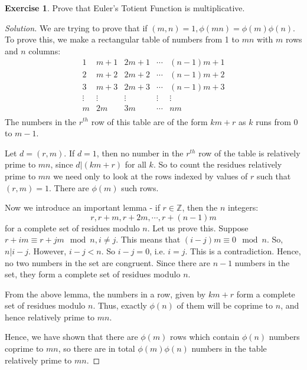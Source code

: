 \documentclass[12pt,letterpaper]{amsbook}
\theoremstyle{definition}
\newtheorem*{exercise}{Exercise}
\newenvironment{solution}
  {\renewcommand\qedsymbol{$\blacksquare$}\begin{proof}[Solution]}
  {\end{proof}}
\newcommand{\Z}{\mathbb{Z}}
\begin{document}
\begin{exercise}
  Prove that Euler's Totient Function is multiplicative. 
\end{exercise}
\begin{solution}
  We are trying to prove that if $(m,n) = 1, \phi(mn) = \phi(m) \phi(n)$. To prove this, we make a rectangular table of numbers from 1 to $mn$ with $m$ rows and $n$ columns:
  \[
  \begin{matrix}
    1 & m+1 & 2m+1 & \cdots & (n-1)m+1 \\ 
    2 & m+2 & 2m+2 & \cdots & (n-1)m+2 \\ 
    3 & m+3 & 2m+3 & \cdots & (n-1)m+3 \\ 
    \vdots & \vdots & \vdots & \vdots & \vdots \\ 
    m & 2m & 3m& \cdots & nm \\ 
  \end{matrix}
\]
  The numbers in the $r^{th}$ row of this table are of the form $km+r$ as $k$ runs from $0 $ to $m-1$.

  Let $d = (r,m)$. If $d = 1$, then no number in the $r^{th}$ row of the table is relatively prime to $mn$, since $d | (km+r)$ for all $k$. So to count the residues relatively prime to $mn$ we need only to look at the rows indexed by values of $r$ such that $(r,m) = 1$. There are $\phi(m)$ such rows.

  Now we introduce an important lemma - if $r \in \Z$, then the $n$ integers:
  \[r,r+m,r+2m,\cdots, r+(n-1)m\] 
  for a complete set of residues modulo $n$. Let us prove this. Suppose $r+im \equiv r+jm \mod n, i \neq j$. This means that $(i-j)m \equiv 0 \mod n$. So, $n|i-j$. However, $i-j < n$. So $i-j = 0$, i.e. $i = j$. This is a contradiction. Hence, no two numbers in the set are congruent. Since there are $n-1$ numbers in the set, they form a complete set of residues modulo $n$.

  From the above lemma, the numbers in a row, given by $km+r$ form a complete set of residues modulo $n$. Thus, exactly $\phi(n)$ of them will be coprime to $n$, and hence relatively prime to $mn$. 

  Hence, we have shown that there are $\phi(m)$ rows which contain $\phi(n)$ numbers coprime to $mn$, so there are in total $\phi(m) \phi(n)$ numbers in the table relatively prime to $mn$.
\end{solution}
\end{document}
